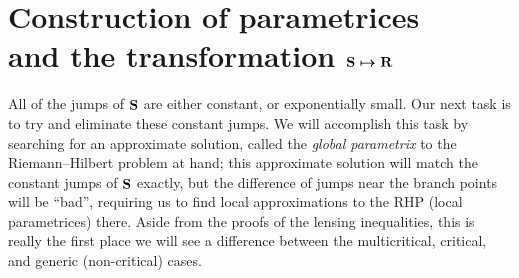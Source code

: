 \documentclass[pdftex]{sigma}
\DeclareMathOperator{\boldS}{{\bf S}}
\numberwithin{equation}{section}
\begin{document}
\section[Construction of parametrices and the transformation ${\bf S} \mapsto {\bf R}$]{Construction of parametrices \\ and the transformation $\boldsymbol{{\bf S} \mapsto {\bf R}}$}\label{section6}
All of the jumps of $\boldS$ are either constant, or exponentially small. Our next task is to try and eliminate these constant jumps. We will accomplish this task by searching for an approximate solution, called the \textit{global parametrix} to the Riemann--Hilbert problem at hand; this
approximate solution will match the constant jumps of $\boldS$ exactly, but the difference of jumps near the branch points will be ``bad'', requiring us to find local approximations to the RHP (local parametrices) there. Aside from the proofs of the lensing inequalities, this is really the first place we will see a difference between the multicritical, critical, and generic (non-critical) cases.
\end{document}
